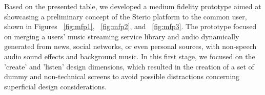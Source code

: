 {{Based on the presented table, we developed a medium fidelity prototype aimed at showcasing a preliminary concept of the Sterio platform to the common user, shown in Figures ~\ref{fig:mfp1}, ~\ref{fig:mfp2}, and ~\ref{fig:mfp3}. The prototype focused on merging a users' music streaming service library and audio dynamically generated from news, social networks, or even personal sources, with non-speech audio sound effects and background music. In this first stage, we focused on the 'create' and 'listen' design dimensions, which resulted in the creation of a set of dummy and non-technical screens to avoid possible distractions concerning superficial design considerations.

\begin{figure}[htbp]
	\centering
	 \qquad
	 \qquad

\end{figure}}}
